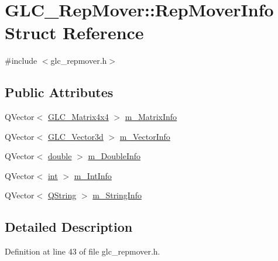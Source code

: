 \hypertarget{struct_g_l_c___rep_mover_1_1_rep_mover_info}{\section{G\-L\-C\-\_\-\-Rep\-Mover\-:\-:Rep\-Mover\-Info Struct Reference}
\label{struct_g_l_c___rep_mover_1_1_rep_mover_info}
}


{\ttfamily \#include $<$glc\-\_\-repmover.\-h$>$}

\subsection*{Public Attributes}
\begin{DoxyCompactItemize}
\item 
Q\-Vector$<$ \hyperlink{class_g_l_c___matrix4x4}{G\-L\-C\-\_\-\-Matrix4x4} $>$ \hyperlink{struct_g_l_c___rep_mover_1_1_rep_mover_info_ae1a0718230d04cab13da611d6861f700}{m\-\_\-\-Matrix\-Info}
\item 
Q\-Vector$<$ \hyperlink{class_g_l_c___vector3d}{G\-L\-C\-\_\-\-Vector3d} $>$ \hyperlink{struct_g_l_c___rep_mover_1_1_rep_mover_info_a8be17904a57a01729fd6afe9c9518703}{m\-\_\-\-Vector\-Info}
\item 
Q\-Vector$<$ \hyperlink{_super_l_u_support_8h_a8956b2b9f49bf918deed98379d159ca7}{double} $>$ \hyperlink{struct_g_l_c___rep_mover_1_1_rep_mover_info_af10be33e0672616879167bfc134cc57e}{m\-\_\-\-Double\-Info}
\item 
Q\-Vector$<$ \hyperlink{ioapi_8h_a787fa3cf048117ba7123753c1e74fcd6}{int} $>$ \hyperlink{struct_g_l_c___rep_mover_1_1_rep_mover_info_a5eba22be97c221929f185fa2b3e932ed}{m\-\_\-\-Int\-Info}
\item 
Q\-Vector$<$ \hyperlink{group___u_a_v_objects_plugin_gab9d252f49c333c94a72f97ce3105a32d}{Q\-String} $>$ \hyperlink{struct_g_l_c___rep_mover_1_1_rep_mover_info_a8e8f2f5fea330ef3d5dd58522ee20d59}{m\-\_\-\-String\-Info}
\end{DoxyCompactItemize}


\subsection{Detailed Description}


Definition at line 43 of file glc\-\_\-repmover.\-h.



